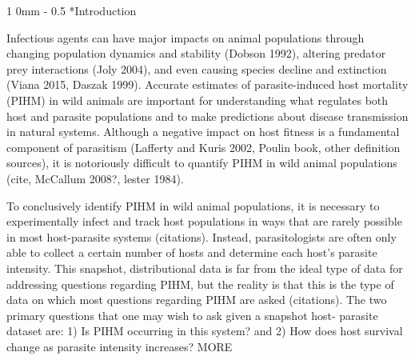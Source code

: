 \documentclass[12pt, a4paper]{article}
\makeatletter
\renewcommand{\section}{\@startsection
{section}%
{1}%
{0mm}%
{-\baselineskip}%
{0.5\baselineskip}%
{\normalfont\bf\large}} %
\makeatother
\begin{document}
\doublespacing

\linenumbers
\section*{Introduction}

Infectious agents can have major impacts on animal populations through changing
population dynamics and stability (Dobson 1992), altering predator prey
interactions (Joly 2004), and even causing species decline and extinction
(Viana 2015, Daszak 1999).  Accurate estimates of parasite-induced host
mortality (PIHM) in wild animals are important for understanding what regulates both
host and parasite populations and to make predictions about disease
transmission in natural systems. Although a negative impact on host fitness is
a fundamental component of parasitism (Lafferty and Kuris 2002, Poulin book,
other definition sources), it is notoriously difficult to quantify PIHM in wild animal populations (cite, McCallum 2008?, lester
1984).

To conclusively identify PIHM in wild animal populations, it is necessary to
experimentally infect and track host populations in ways that are rarely
possible in most host-parasite systems (citations).  Instead, parasitologists
are often only able to collect a certain number of hosts and determine each
host's parasite intensity.  This snapshot, distributional data is far from the
ideal type of data for addressing questions regarding PIHM, but the reality is
that this is the type of data on which most questions regarding PIHM are asked
(citations). The two primary questions that one may wish to ask given a snapshot host-
parasite dataset are: 1) Is PIHM occurring in this system? and 2) How does
host survival change as parasite intensity increases?  MORE
\end{document}

